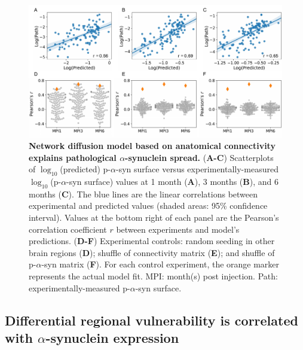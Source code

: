 \begin{figure}[!h]
  \includegraphics[width = \linewidth]{Figures/Fig1.pdf}
  
    \caption{
      \textbf{Network diffusion model based on anatomical connectivity explains pathological $\alpha$-synuclein spread.}
       (\textbf{A-C}) Scatterplots of $\log_{10}$(predicted) p-$\alpha$-syn surface versus experimentally-measured $\log_{10}$(p-$\alpha$-syn surface) values at 1 month (\textbf{A}), 3 months (\textbf{B}), and 6 months (\textbf{C}). The blue lines are the linear correlations between experimental and predicted values (shaded areas: 95\% confidence interval). Values at the bottom right of each panel are the Pearson's correlation coefficient $r$ between experiments and model's predictions.
      (\textbf{D-F}) Experimental controls: random seeding in other brain regions (\textbf{D}); shuffle of connectivity matrix (\textbf{E}); and shuffle of p-$\alpha$-syn matrix (\textbf{F}). For each control experiment, the orange marker represents the actual model fit. MPI: month(s) post injection. Path: experimentally-measured p-$\alpha$-syn surface.}
  
\end{figure}
    
\subsection{Differential regional vulnerability is correlated with $\alpha$-synuclein expression}


